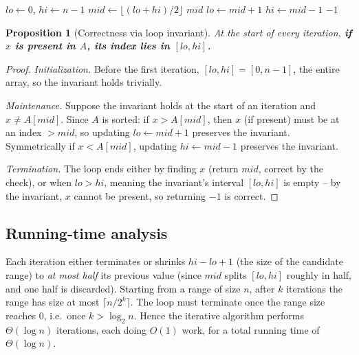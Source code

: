 \documentclass[11pt]{article}
\newtheorem{proposition}[theorem]{Proposition}
\begin{document}
\begin{algorithm}[h]
\caption{\textsc{BinarySearchIterative}$(A, x)$}
\begin{algorithmic}[1]
\State $lo \gets 0$, $hi \gets n - 1$
    \State $mid \gets \lfloor (lo + hi)/2 \rfloor$
        \State \Return $mid$
        \State $lo \gets mid + 1$
    \Else
        \State $hi \gets mid - 1$
    \EndIf
\EndWhile
\State \Return $-1$
\end{algorithmic}
\end{algorithm}

\begin{proposition}[Correctness via loop invariant]
At the start of every iteration, \textbf{if $x$ is present in $A$, its index lies in
$[lo, hi]$.}
\end{proposition}
\begin{proof}
\emph{Initialization.} Before the first iteration, $[lo,hi] = [0, n-1]$, the entire array,
so the invariant holds trivially.

\emph{Maintenance.} Suppose the invariant holds at the start of an iteration and $x \ne
A[mid]$. Since $A$ is sorted: if $x > A[mid]$, then $x$ (if present) must be at an index
$> mid$, so updating $lo \gets mid+1$ preserves the invariant. Symmetrically if $x <
A[mid]$, updating $hi \gets mid - 1$ preserves the invariant.

\emph{Termination.} The loop ends either by finding $x$ (return $mid$, correct by the
check), or when $lo > hi$, meaning the invariant's interval $[lo,hi]$ is empty -- by the
invariant, $x$ cannot be present, so returning $-1$ is correct.
\end{proof}

\subsection{Running-time analysis}

Each iteration either terminates or shrinks $hi - lo + 1$ (the size of the candidate range)
to \emph{at most half} its previous value (since $mid$ splits $[lo,hi]$ roughly in half,
and one half is discarded). Starting from a range of size $n$, after $k$ iterations the
range has size at most $\lceil n / 2^k \rceil$. The loop must terminate once the range size
reaches $0$, i.e.\ once $k > \log_2 n$. Hence the iterative algorithm performs
$\Theta(\log n)$ iterations, each doing $O(1)$ work, for a total running time of
$\Theta(\log n)$.
\end{document}
